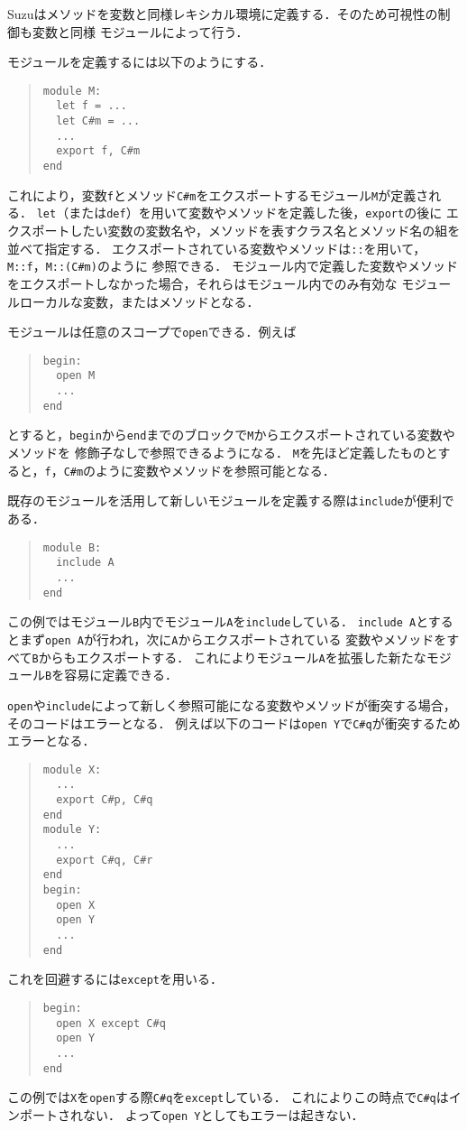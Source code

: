 \documentclass[a4paper,11pt,dvipdfmx]{jreport}
\begin{document}
Suzuはメソッドを変数と同様レキシカル環境に定義する．そのため可視性の制御も変数と同様
モジュールによって行う．

モジュールを定義するには以下のようにする．
\begin{quote}
\begin{verbatim}
module M:
  let f = ...
  let C#m = ...
  ...
  export f, C#m
end
\end{verbatim}
\end{quote}
これにより，変数\verb|f|とメソッド\verb|C#m|をエクスポートするモジュール\verb|M|が定義される．
\verb|let|（または\verb|def|）を用いて変数やメソッドを定義した後，\verb|export|の後に
エクスポートしたい変数の変数名や，メソッドを表すクラス名とメソッド名の組を並べて指定する．
エクスポートされている変数やメソッドは\verb|::|を用いて，\verb|M::f|，\verb|M::(C#m)|のように
参照できる．
モジュール内で定義した変数やメソッドをエクスポートしなかった場合，それらはモジュール内でのみ有効な
モジュールローカルな変数，またはメソッドとなる．

モジュールは任意のスコープで\verb|open|できる．例えば
\begin{quote}
\begin{verbatim}
begin:
  open M
  ...
end
\end{verbatim}
\end{quote}
とすると，\verb|begin|から\verb|end|までのブロックで\verb|M|からエクスポートされている変数やメソッドを
修飾子なしで参照できるようになる．
\verb|M|を先ほど定義したものとすると，\verb|f|，\verb|C#m|のように変数やメソッドを参照可能となる．

既存のモジュールを活用して新しいモジュールを定義する際は\verb|include|が便利である．
\begin{quote}
\begin{verbatim}
module B:
  include A
  ...
end
\end{verbatim}
\end{quote}
この例ではモジュール\verb|B|内でモジュール\verb|A|を\verb|include|している．
\verb|include A|とするとまず\verb|open A|が行われ，次に\verb|A|からエクスポートされている
変数やメソッドをすべて\verb|B|からもエクスポートする．
これによりモジュール\verb|A|を拡張した新たなモジュール\verb|B|を容易に定義できる．

\verb|open|や\verb|include|によって新しく参照可能になる変数やメソッドが衝突する場合，
そのコードはエラーとなる．
例えば以下のコードは\verb|open Y|で\verb|C#q|が衝突するためエラーとなる．
\begin{quote}
\begin{verbatim}
module X:
  ... 
  export C#p, C#q
end
module Y:
  ...
  export C#q, C#r
end
begin:
  open X
  open Y
  ...
end
\end{verbatim}
\end{quote}
これを回避するには\verb|except|を用いる．
\begin{quote}
\begin{verbatim}
begin:
  open X except C#q
  open Y
  ...
end
\end{verbatim}
\end{quote}
この例では\verb|X|を\verb|open|する際\verb|C#q|を\verb|except|している．
これによりこの時点で\verb|C#q|はインポートされない．
よって\verb|open Y|としてもエラーは起きない．
\end{document}

